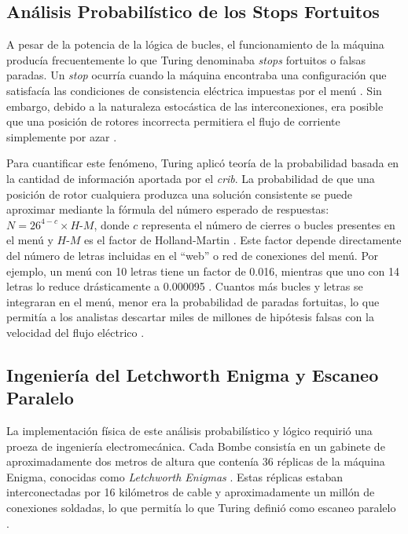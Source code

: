 \subsection{Análisis Probabilístico de los Stops Fortuitos}

A pesar de la potencia de la lógica de bucles, el funcionamiento de la máquina producía frecuentemente lo que Turing denominaba \textit{stops} fortuitos o falsas paradas. Un \textit{stop} ocurría cuando la máquina encontraba una configuración que satisfacía las condiciones de consistencia eléctrica impuestas por el menú \cite{hodges2014turing}. Sin embargo, debido a la naturaleza estocástica de las interconexiones, era posible que una posición de rotores incorrecta permitiera el flujo de corriente simplemente por azar \cite{hodges2014turing, copeland2004essential}.

Para cuantificar este fenómeno, Turing aplicó teoría de la probabilidad basada en la cantidad de información aportada por el \textit{crib}. La probabilidad de que una posición de rotor cualquiera produzca una solución consistente se puede aproximar mediante la fórmula del número esperado de respuestas: $N = 26^{4-c} \times H\text{-}M$, donde $c$ representa el número de cierres o bucles presentes en el menú y $H\text{-}M$ es el factor de Holland-Martin \cite{copeland2004essential}. Este factor depende directamente del número de letras incluidas en el ``web'' o red de conexiones del menú. Por ejemplo, un menú con 10 letras tiene un factor de 0.016, mientras que uno con 14 letras lo reduce drásticamente a 0.000095 \cite{copeland2004essential}. Cuantos más bucles y letras se integraran en el menú, menor era la probabilidad de paradas fortuitas, lo que permitía a los analistas descartar miles de millones de hipótesis falsas con la velocidad del flujo eléctrico \cite{hodges2014turing}.

\subsection{Ingeniería del Letchworth Enigma y Escaneo Paralelo}

La implementación física de este análisis probabilístico y lógico requirió una proeza de ingeniería electromecánica. Cada Bombe consistía en un gabinete de aproximadamente dos metros de altura que contenía 36 réplicas de la máquina Enigma, conocidas como \textit{Letchworth Enigmas} \cite{copeland2006colossus}. Estas réplicas estaban interconectadas por 16 kilómetros de cable y aproximadamente un millón de conexiones soldadas, lo que permitía lo que Turing definió como escaneo paralelo \cite{hodges2014turing, copeland2006colossus}.

